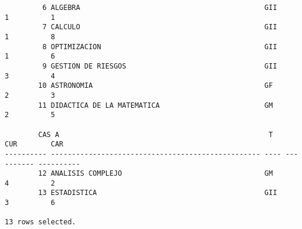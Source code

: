 \documentclass[11pt]{report}
\begin{document}
\begin{verbatim}
         6 ALGEBRA                                            GII           1          1                                                                                                                                                                                                                    
         7 CALCULO                                            GII           1          8                                                                                                                                                                                                                    
         8 OPTIMIZACION                                       GII           1          6                                                                                                                                                                                                                    
         9 GESTION DE RIESGOS                                 GII           3          4                                                                                                                                                                                                                    
        10 ASTRONOMIA                                         GF            2          3                                                                                                                                                                                                                    
        11 DIDACTICA DE LA MATEMATICA                         GM            2          5                                                                                                                                                                                                                    

        CAS A                                                  T           CUR        CAR                                                                                                                                                                                                                    
---------- -------------------------------------------------- ---- ---------- ----------                                                                                                                                                                                                                    
        12 ANALISIS COMPLEJO                                  GM            4          2                                                                                                                                                                                                                    
        13 ESTADISTICA                                        GII           3          6                                                                                                                                                                                                                    

13 rows selected.
  \end{verbatim}
\end{document}
